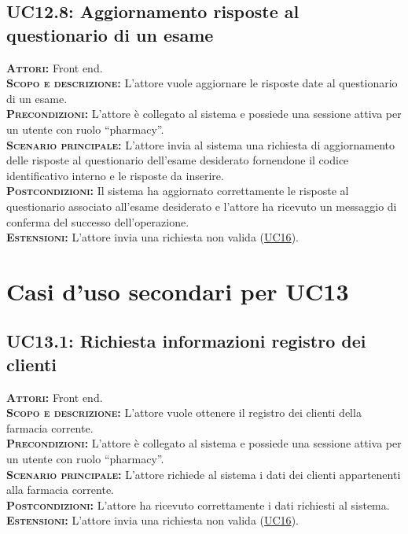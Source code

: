 \subsection{UC12.8: Aggiornamento risposte al questionario di un esame}
\label{sec:UC128}
\textsc{\textbf{Attori:}} Front end.\\
\textsc{\textbf{Scopo e descrizione:}} L'attore vuole aggiornare le risposte date al questionario di un esame.\\
\textsc{\textsc{\textbf{Precondizioni:}}} L'attore è collegato al sistema e possiede una sessione attiva per un utente con ruolo ``pharmacy''.\\
\textsc{\textbf{Scenario principale:}} L'attore invia al sistema una richiesta di aggiornamento delle risposte al questionario dell'esame desiderato fornendone il codice identificativo interno e le risposte da inserire.\\
\textsc{\textbf{Postcondizioni:}} Il sistema ha aggiornato correttamente le risposte al questionario associato all'esame desiderato e l'attore ha ricevuto un messaggio di conferma del successo dell'operazione.\\
\textsc{\textbf{Estensioni:}} L'attore invia una richiesta non valida (\hyperref[sec:UC16]{UC16}).

\section{Casi d'uso secondari per UC13}
\subsection{UC13.1: Richiesta informazioni registro dei clienti}
\label{sec:UC131}
\textsc{\textbf{Attori:}} Front end.\\
\textsc{\textbf{Scopo e descrizione:}} L'attore vuole ottenere il registro dei clienti della farmacia corrente.\\
\textsc{\textsc{\textbf{Precondizioni:}}} L'attore è collegato al sistema e possiede una sessione attiva per un utente con ruolo ``pharmacy''.\\
\textsc{\textbf{Scenario principale:}} L'attore richiede al sistema i dati dei clienti appartenenti alla farmacia corrente.\\
\textsc{\textbf{Postcondizioni:}} L'attore ha ricevuto correttamente i dati richiesti al sistema.\\
\textsc{\textbf{Estensioni:}} L'attore invia una richiesta non valida (\hyperref[sec:UC16]{UC16}).

